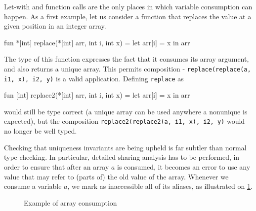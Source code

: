 \documentclass[oneside]{memoir}
\newcommand\aliases[1]{\textrm{aliases}(#1)}
\begin{document}
Let-with and function calls are the only places in which variable
consumption can happen.  As a first example, let us consider a
function that replaces the value at a given position in an integer
array.

\begin{colorcode}
  fun *[int] replace(*[int] arr, int i, int x) =
    let arr[i] = x in arr
\end{colorcode}

The type of this function expresses the fact that it consumes its
array argument, and also returns a unique array.  This permits
composition - \texttt{replace(replace(a, i1, x), i2, y)} is a valid
application.  Defining \texttt{replace} as
\begin{colorcode}
  fun [int] replace2(*[int] arr, int i, int x) =
    let arr[i] = x in arr
\end{colorcode}
would still be type correct (a unique array can be used anywhere a
nonunique is expected), but the composition
\texttt{replace2(replace2(a, i1, x), i2, y)} would no longer be well
typed.

Checking that uniqueness invariants are being upheld is far subtler
than normal type checking.  In particular, detailed sharing analysis
has to be performed, in order to ensure that after an array $a$ is
consumed, it becomes an error to use any value that may refer to
(parts of) the old value of the array.  Whenever we consume a variable
$a$, we mark as inaccessible all of its aliases, as illustrated on
\cref{fig:consumption}.

\begin{figure}
\begin{center}
\end{center}
\caption{Example of array consumption}
\label{fig:consumption}
\end{figure}
\end{document}
